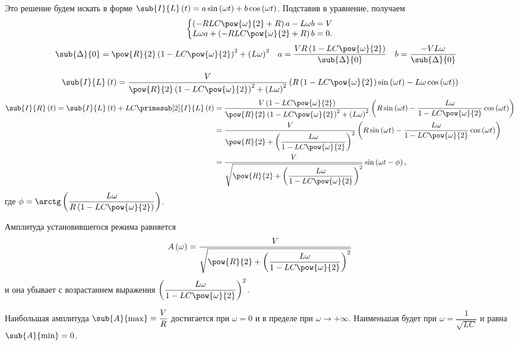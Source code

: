 \documentclass[a5paper,10pt]{article}
\begin{document}
Это решение будем искать в форме 
$\sub{I}{L}\br{t} = a \sin\br{\omega t} + b \cos\br{\omega t}$.
Подставив в уравнение, получаем
$$\tsys{
    \br{-RLC\pow{\omega}{2} + R} a - L\omega b = V \\
    L\omega a + \br{-RLC\pow{\omega}{2} + R} b = 0.
}$$
\begin{align*}
    \sub{\Delta}{0} = \pow{R}{2}\br{1 - LC\pow{\omega}{2}}^2 + \br{L\omega}^2 &&
    a = \frac {VR\br{1 - LC\pow{\omega}{2}}} {\sub{\Delta}{0}} &&
    b = \frac {-VL\omega} {\sub{\Delta}{0}} &&
\end{align*}

$$\sub{I}{L}\br{t} 
    = \frac{V}{\pow{R}{2}\br{1 - LC\pow{\omega}{2}}^2 + \br{L\omega}^2} 
        \br{R\br{1 - LC\pow{\omega}{2}} \sin\br{\omega t} - L\omega \cos\br{\omega t}}
$$
\begin{align*}
    \sub{I}{R}\br{t} 
    = \sub{I}{L}\br{t} + LC\primesub[2]{I}{L}\br{t} 
    & = \frac {V\br{1 - LC\pow{\omega}{2}}} 
        {\pow{R}{2}\br{1 - LC\pow{\omega}{2}}^2 + \br{L\omega}^2} 
        \br{R \sin\br{\omega t} - \frac {L\omega} {1 - LC\pow{\omega}{2}} \cos\br{\omega t}} \\
    & = \frac {V} 
        {\pow{R}{2} + \br{\dfrac {L\omega}{1 - LC\pow{\omega}{2}}}^2}
        \br{R \sin\br{\omega t} - \frac {L\omega} {1 - LC\pow{\omega}{2}} \cos\br{\omega t}} \\
    & = \frac {V}
        {\sqrt{\pow{R}{2} + \br{\dfrac {L\omega}{1 - LC\pow{\omega}{2}}}^2}} \sin\br{\omega t - \phi},
\end{align*}
где $\phi = \arctg\br{\dfrac{L\omega}{R\br{1 - LC\pow{\omega}{2}}}}$.

Амплитуда установившегося режима равняется 
$$A\br{\omega} = \dfrac {V} {\sqrt{\pow{R}{2} + \br{\dfrac {L\omega}{1 - LC\pow{\omega}{2}}}^2}}$$
и она убывает с возрастанием выражения $\br{\dfrac {L\omega}{1 - LC\pow{\omega}{2}}}^2$.

Наибольшая амплитуда $\sub{A}{\max} = \dfrac{V}{R}$ 
достигается при $\omega = 0$ и в пределе при $\omega \to +\infty$.
Наименьшая будет при $\omega = \dfrac {1} {\sqrt{LC}}$
и равна $\sub{A}{\min} = 0$.
\end{document}
